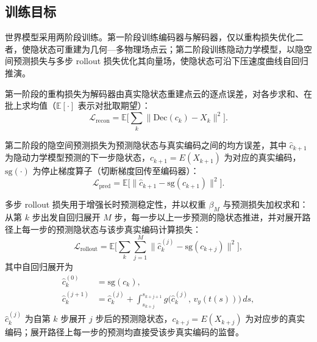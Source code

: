 \subsection{训练目标}
世界模型采用两阶段训练。第一阶段训练编码器与解码器，仅以重构损失优化二者，使隐状态可重建为几何—多物理场点云；第二阶段训练隐动力学模型，以隐空间预测损失与多步 rollout 损失优化其向量场，使隐状态可沿下压速度曲线自回归推演。

第一阶段的重构损失为解码器由真实隐状态重建点云的逐点误差，对各步求和、在批上求均值（$\mathbb{E}[\cdot]$ 表示对批取期望）：
\begin{equation}
\mathcal{L}_{\text{recon}}=\mathbb{E}\Big[\sum_{k}\big\|\mathrm{Dec}(c_k)-X_k\big\|^{2}\Big] .
\end{equation}

第二阶段的隐空间预测损失为预测隐状态与真实编码之间的均方误差，其中 $\hat{c}_{k+1}$ 为隐动力学模型预测的下一步隐状态，$c_{k+1}=E(X_{k+1})$ 为对应的真实编码，$\mathrm{sg}(\cdot)$ 为停止梯度算子（切断梯度回传至编码器）：
\begin{equation}
\mathcal{L}_{\text{pred}}=\mathbb{E}\Big[\big\|\hat{c}_{k+1}-\mathrm{sg}(c_{k+1})\big\|^{2}\Big] .
\end{equation}

多步 rollout 损失用于增强长时预测稳定性，并以权重 $\beta_M$ 与预测损失加权求和：从第 $k$ 步出发自回归展开 $M$ 步，每一步以上一步预测的隐状态推进，并对展开路径上每一步的预测隐状态与该步真实编码计算损失：
\begin{equation}
\mathcal{L}_{\text{rollout}}=\mathbb{E}\Big[\sum_{k}\sum_{j=1}^{M}\big\|\hat{c}_{k}^{(j)}-\mathrm{sg}(c_{k+j})\big\|^{2}\Big],
\end{equation}
其中自回归展开为
\begin{equation}
\begin{aligned}
\hat{c}_{k}^{(0)} &= \mathrm{sg}(c_k), \\
\hat{c}_{k}^{(j+1)} &= \hat{c}_{k}^{(j)}+\int_{s_{k+j}}^{s_{k+j+1}} g\big(\hat{c}_{k}^{(j)},\,v_y(t(s))\big)\,ds ,
\end{aligned}
\end{equation}
$\hat{c}_{k}^{(j)}$ 为自第 $k$ 步展开 $j$ 步后的预测隐状态，$c_{k+j}=E(X_{k+j})$ 为对应步的真实编码；展开路径上每一步的预测均直接受该步真实编码的监督。
